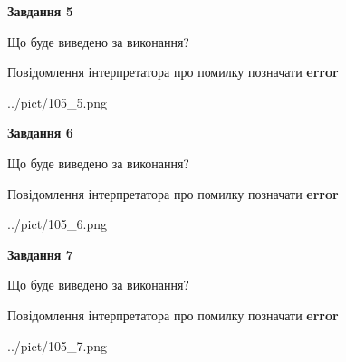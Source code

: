 \documentclass[10pt, ukrainian]{article}
\begin{document}
{\begin {large}
{\begin {center}\textbf{Завдання 5}\end {center}}\par
Що буде виведено за виконання? \par
Повідомлення інтерпретатора про помилку позначати \textbf{error}

\begin{center}
	{../pict/105_5.png}
\end{center}
\newpage

{\begin {center}\textbf{Завдання 6}\end {center}}\par
Що буде виведено за виконання? \par
Повідомлення інтерпретатора про помилку позначати \textbf{error}

\begin{center}
	{../pict/105_6.png}
\end{center}
\newpage

{\begin {center}\textbf{Завдання 7}\end {center}}\par
Що буде виведено за виконання? \par
Повідомлення інтерпретатора про помилку позначати \textbf{error}

\begin{center}
	{../pict/105_7.png}
\end{center}
\newpage

\end {large}}
\end{document}
